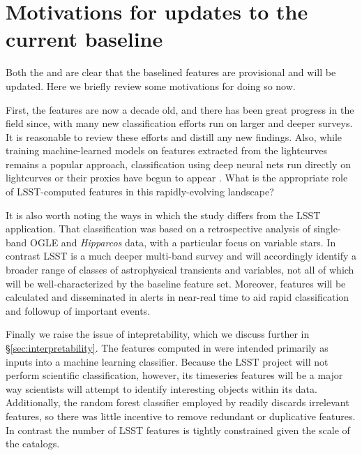 \documentclass[DM,authoryear,toc]{lsstdoc}
\begin{document}
\section{Motivations for updates to the current baseline}

Both the \DPDD and  are clear that the baselined features are provisional and will be updated.  
Here we briefly review some motivations for doing so now.

First, the \citet{2011ApJ...733...10R} features are now a decade old, and there has been great progress in the field since, with many new classification efforts run on larger and deeper surveys.
It is reasonable to review these efforts and distill any new findings.
Also, while training machine-learned models on features extracted from the lightcurves remains a popular approach, classification using deep neural nets run directly on lightcurves or their proxies have begun to appear \citep[e.g.,][]{Mahabal:17:DLClassification,Naul:18:RNNClassifier,Muthukrishna:19:RAPIDClassification}.
What is the appropriate role of LSST-computed features in this rapidly-evolving landscape?

It is also worth noting the ways in which the \citet{2011ApJ...733...10R} study differs from the LSST application.
That classification was based on a retrospective analysis of single-band OGLE and \textit{Hipparcos} data, with a particular focus on variable stars.
In contrast LSST is a much deeper multi-band survey and will accordingly identify a broader range of classes of astrophysical transients and variables, not all of which will be well-characterized by the baseline feature set.
Moreover, features will be calculated and disseminated in alerts in near-real time to aid rapid classification and followup of important events. 

Finally we raise the issue of intepretability, which we discuss further in \S \ref{sec:interpretability}.
The features computed in \citet{2011ApJ...733...10R} were intended primarily as inputs into a machine learning classifier.
Because the LSST project will not perform scientific classification, however, its timeseries features will be a major way scientists will attempt to identify interesting objects within its data.
Additionally, the random forest classifier employed by \citet{2011ApJ...733...10R} readily discards irrelevant features, so there was little incentive to remove redundant or duplicative features.
In contrast the number of LSST features is tightly constrained given the scale of the catalogs.
\end{document}
